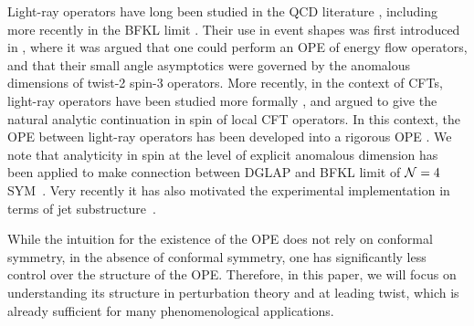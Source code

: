 \documentclass[letterpaper,11pt]{article}
\begin{document}
Light-ray operators have long been studied in the QCD literature \cite{Balitsky:1987bk,Balitsky:1988fi,Balitsky:1990ck,Braun:2003rp}, including more recently in the BFKL limit \cite{Balitsky:2013npa,Balitsky:2015oux,Balitsky:2015tca}. Their use in event shapes was first introduced in \cite{Hofman:2008ar}, where it was argued that one could perform an OPE of energy flow operators, and that their small angle asymptotics were governed by the anomalous dimensions of twist-2 spin-3 operators.  More recently, in the context of CFTs, light-ray operators have been studied more formally \cite{Kravchuk:2018htv}, and argued to give the natural analytic continuation in spin \cite{Caron-Huot:2017vep} of local CFT operators. In this context, the OPE between light-ray operators has been developed into a rigorous OPE \cite{Kologlu:2019mfz,Kologlu:2019bco,1822249}. We note that analyticity in spin at the level of explicit anomalous dimension has been applied to make connection between DGLAP and BFKL limit of ${\cal N}=4$ SYM~\cite{Kotikov:2002ab,Kotikov:2003fb,Kotikov:2004er,Kotikov:2005gr}. Very recently it has also motivated the experimental implementation in terms of jet substructure~\cite{Chen:2020vvp}.



While the intuition for the existence of the OPE does not rely on conformal symmetry, in the absence of conformal symmetry, one has significantly less control over the structure of the OPE. Therefore, in this paper, we will focus on understanding its structure in perturbation theory and at leading twist, which is already sufficient for many phenomenological applications.
\end{document}
